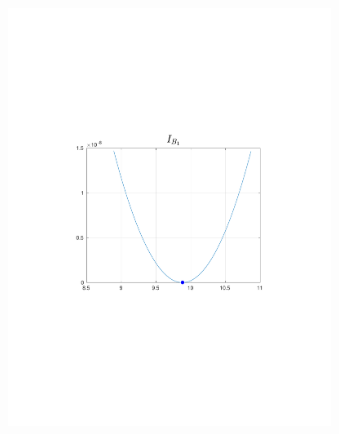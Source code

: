 \documentclass{beamer}
\begin{document}
\begin{frame}
\begin{columns}[t]
\begin{figure}
            \includegraphics[trim=4cm 4cm 4cm 8cm, clip=true, width=\linewidth]{img/InertiaApproxComp}
        \end{figure}
        \begin{figure}
            \centering

\end{figure}
\end{columns}
\end{frame}
\end{document}
